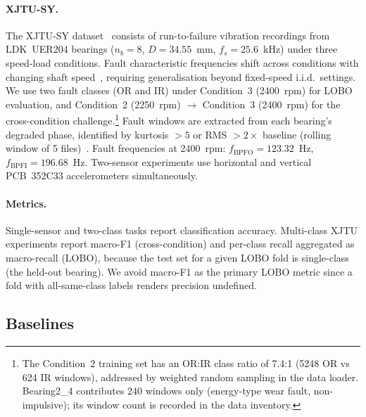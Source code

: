 \paragraph{XJTU-SY.}
The XJTU-SY dataset~\cite{xjtu_paper} consists of run-to-failure vibration
recordings from LDK~UER204 bearings ($n_b=8$, $D=34.55$~mm, $f_s=25.6$~kHz)
under three speed-load conditions.
Fault characteristic frequencies shift across conditions with changing
shaft speed~\cite{liu2023var_speed,an2019rnn_bearing,liao2020variable_domain},
requiring generalisation beyond fixed-speed i.i.d.\ settings.
We use two fault classes (OR and IR) under Condition~3 (2400~rpm) for
LOBO evaluation, and Condition~2 (2250~rpm) $\to$ Condition~3 (2400~rpm)
for the cross-condition challenge.\footnote{The Condition~2 training set has an OR:IR class ratio of 7.4:1 (5248 OR vs 624 IR windows), addressed by weighted random sampling in the data loader. Bearing2\_4 contributes 240 windows only (energy-type wear fault, non-impulsive); its window count is recorded in the data inventory.}
Fault windows are extracted from each bearing's degraded phase, identified
by kurtosis $> 5$ or RMS $> 2 \times$ baseline (rolling window of 5 files)~\cite{antoni2006spectral_kurtosis}.
Fault frequencies at 2400~rpm:
$f_{\text{BPFO}} = 123.32$~Hz, $f_{\text{BPFI}} = 196.68$~Hz.
Two-sensor experiments use horizontal and vertical PCB~352C33 accelerometers
simultaneously.

\paragraph{Metrics.}
Single-sensor and two-class tasks report classification accuracy.
Multi-class XJTU experiments report macro-F1 (cross-condition) and
per-class recall aggregated as macro-recall (LOBO), because the test set
for a given LOBO fold is single-class (the held-out bearing).
We avoid macro-F1 as the primary LOBO metric since a fold with all-same-class
labels renders precision undefined.


\subsection{Baselines}
\label{subsec:baselines}

